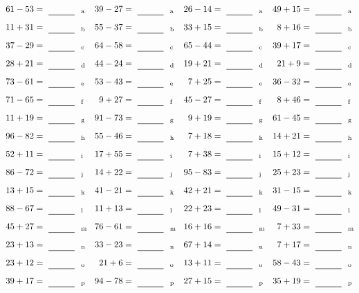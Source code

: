 \documentclass
[
  draft    = true,
  fontsize = 11pt,
  parskip  = half-
]
{scrartcl}
\begin{document}
\clearpage
\begin{align*}
    \pline{61-53}&=\rline{a}
  & \pline{39-27}&=\rline{a}
  & \pline{26-14}&=\rline{a}
  & \pline{49+15}&=\rline{a} \\[1ex]
    \pline{11+31}&=\rline{b}
  & \pline{55-37}&=\rline{b}
  & \pline{33+15}&=\rline{b}
  & \pline{8+16}&=\rline{b} \\[1ex]
    \pline{37-29}&=\rline{c}
  & \pline{64-58}&=\rline{c}
  & \pline{65-44}&=\rline{c}
  & \pline{39+17}&=\rline{c} \\[1ex]
    \pline{28+21}&=\rline{d}
  & \pline{44-24}&=\rline{d}
  & \pline{19+21}&=\rline{d}
  & \pline{21+9}&=\rline{d} \\[1ex]
    \pline{73-61}&=\rline{e}
  & \pline{53-43}&=\rline{e}
  & \pline{7+25}&=\rline{e}
  & \pline{36-32}&=\rline{e} \\[1ex]
    \pline{71-65}&=\rline{f}
  & \pline{9+27}&=\rline{f}
  & \pline{45-27}&=\rline{f}
  & \pline{8+46}&=\rline{f} \\[1ex]
    \pline{11+19}&=\rline{g}
  & \pline{91-73}&=\rline{g}
  & \pline{9+19}&=\rline{g}
  & \pline{61-45}&=\rline{g} \\[1ex]
    \pline{96-82}&=\rline{h}
  & \pline{55-46}&=\rline{h}
  & \pline{7+18}&=\rline{h}
  & \pline{14+21}&=\rline{h} \\[1ex]
    \pline{52+11}&=\rline{i}
  & \pline{17+55}&=\rline{i}
  & \pline{7+38}&=\rline{i}
  & \pline{15+12}&=\rline{i} \\[1ex]
    \pline{86-72}&=\rline{j}
  & \pline{14+22}&=\rline{j}
  & \pline{95-83}&=\rline{j}
  & \pline{25+23}&=\rline{j} \\[1ex]
    \pline{13+15}&=\rline{k}
  & \pline{41-21}&=\rline{k}
  & \pline{42+21}&=\rline{k}
  & \pline{31-15}&=\rline{k} \\[1ex]
    \pline{88-67}&=\rline{l}
  & \pline{11+13}&=\rline{l}
  & \pline{22+23}&=\rline{l}
  & \pline{49-31}&=\rline{l} \\[1ex]
    \pline{45+27}&=\rline{m}
  & \pline{76-61}&=\rline{m}
  & \pline{16+16}&=\rline{m}
  & \pline{7+33}&=\rline{m} \\[1ex]
    \pline{23+13}&=\rline{n}
  & \pline{33-23}&=\rline{n}
  & \pline{67+14}&=\rline{n}
  & \pline{7+17}&=\rline{n} \\[1ex]
    \pline{23+12}&=\rline{o}
  & \pline{21+6}&=\rline{o}
  & \pline{13+11}&=\rline{o}
  & \pline{58-43}&=\rline{o} \\[1ex]
    \pline{39+17}&=\rline{p}
  & \pline{94-78}&=\rline{p}
  & \pline{27+15}&=\rline{p}
  & \pline{35+19}&=\rline{p}
\end{align*}
\end{document}
